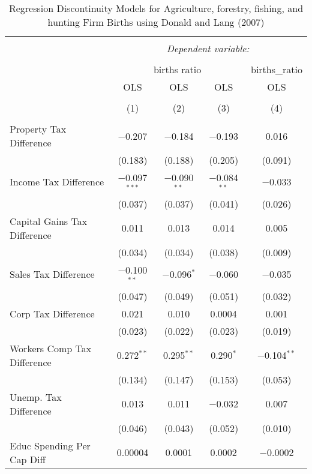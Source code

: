 
\begin{table}[!htbp] \centering 
  \caption{Regression Discontinuity Models for  Agriculture, forestry, fishing, and hunting Firm Births using Donald and Lang (2007)} 
  \label{} 
\begin{tabular}{@{\extracolsep{5pt}}lcccc} 
\\[-1.8ex]\hline 
\hline \\[-1.8ex] 
 & \multicolumn{4}{c}{\textit{Dependent variable:}} \\ 
\cline{2-5} 
\\[-1.8ex] & \multicolumn{3}{c}{births ratio} & births\_ratio \\ 
 & OLS & OLS & OLS & OLS \\ 
\\[-1.8ex] & (1) & (2) & (3) & (4)\\ 
\hline \\[-1.8ex] 
 Property Tax Difference & $-$0.207 & $-$0.184 & $-$0.193 & 0.016 \\ 
  & (0.183) & (0.188) & (0.205) & (0.091) \\ 
  Income Tax Difference & $-$0.097$^{***}$ & $-$0.090$^{**}$ & $-$0.084$^{**}$ & $-$0.033 \\ 
  & (0.037) & (0.037) & (0.041) & (0.026) \\ 
  Capital Gains Tax Difference & 0.011 & 0.013 & 0.014 & 0.005 \\ 
  & (0.034) & (0.034) & (0.038) & (0.009) \\ 
  Sales Tax Difference & $-$0.100$^{**}$ & $-$0.096$^{*}$ & $-$0.060 & $-$0.035 \\ 
  & (0.047) & (0.049) & (0.051) & (0.032) \\ 
  Corp Tax Difference & 0.021 & 0.010 & 0.0004 & 0.001 \\ 
  & (0.023) & (0.022) & (0.023) & (0.019) \\ 
  Workers Comp Tax Difference & 0.272$^{**}$ & 0.295$^{**}$ & 0.290$^{*}$ & $-$0.104$^{**}$ \\ 
  & (0.134) & (0.147) & (0.153) & (0.053) \\ 
  Unemp. Tax Difference & 0.013 & 0.011 & $-$0.032 & 0.007 \\ 
  & (0.046) & (0.043) & (0.052) & (0.010) \\ 
  Educ Spending Per Cap Diff & 0.00004 & 0.0001 & 0.0002 & $-$0.0002 \\ 

\end{tabular}
\end{table}
